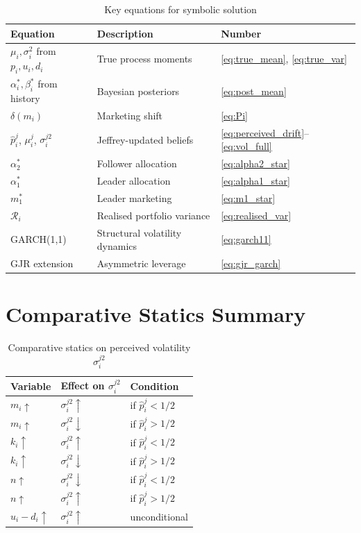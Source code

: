 \documentclass[12pt,a4paper]{article}
\newcommand{\1}{\mathbf{1}}
\begin{document}
\begin{table}[H]
  \centering
  \caption{Key equations for symbolic solution}
  \label{tab:eqs}
  \begin{tabular}{@{} l l l @{}}
    \toprule
    Equation & Description & Number \\
    \midrule
    $\mu_i, \sigma_i^2$ from $p_i, u_i, d_i$ & True process moments & \eqref{eq:true_mean}, \eqref{eq:true_var} \\
    $\alpha_i^*, \beta_i^*$ from history & Bayesian posteriors & \eqref{eq:post_mean} \\
    $\delta(m_i)$ & Marketing shift & \eqref{eq:Pi} \\
    $\hat{p}_i^j$, $\mu_i^j$, $\sigma_i^{j2}$ & Jeffrey-updated beliefs & \eqref{eq:perceived_drift}--\eqref{eq:vol_full} \\
    $\alpha_2^*$ & Follower allocation & \eqref{eq:alpha2_star} \\
    $\alpha_1^*$ & Leader allocation & \eqref{eq:alpha1_star} \\
    $m_1^*$ & Leader marketing & \eqref{eq:m1_star} \\
    $\mathcal{R}_i$ & Realised portfolio variance & \eqref{eq:realised_var} \\
    GARCH(1,1) & Structural volatility dynamics & \eqref{eq:garch11} \\
    GJR extension & Asymmetric leverage & \eqref{eq:gjr_garch} \\
    \bottomrule
  \end{tabular}
\end{table}

\section{Comparative Statics Summary}

\begin{table}[H]
  \centering
  \caption{Comparative statics on perceived volatility $\sigma_i^{j2}$}
  \begin{tabular}{@{} l l l @{}}
    \toprule
    Variable & Effect on $\sigma_i^{j2}$ & Condition \\
    \midrule
    $m_i \uparrow$ & $\sigma_i^{j2} \uparrow$ & if $\hat{p}_i^j < 1/2$ \\
    $m_i \uparrow$ & $\sigma_i^{j2} \downarrow$ & if $\hat{p}_i^j > 1/2$ \\
    $k_i \uparrow$ & $\sigma_i^{j2} \uparrow$ & if $\hat{p}_i^j < 1/2$ \\
    $k_i \uparrow$ & $\sigma_i^{j2} \downarrow$ & if $\hat{p}_i^j > 1/2$ \\
    $n \uparrow$ & $\sigma_i^{j2} \downarrow$ & if $\hat{p}_i^j < 1/2$ \\
    $n \uparrow$ & $\sigma_i^{j2} \uparrow$ & if $\hat{p}_i^j > 1/2$ \\
    $u_i - d_i \uparrow$ & $\sigma_i^{j2} \uparrow$ & unconditional \\
    \bottomrule
  \end{tabular}
\end{table}
\end{document}
